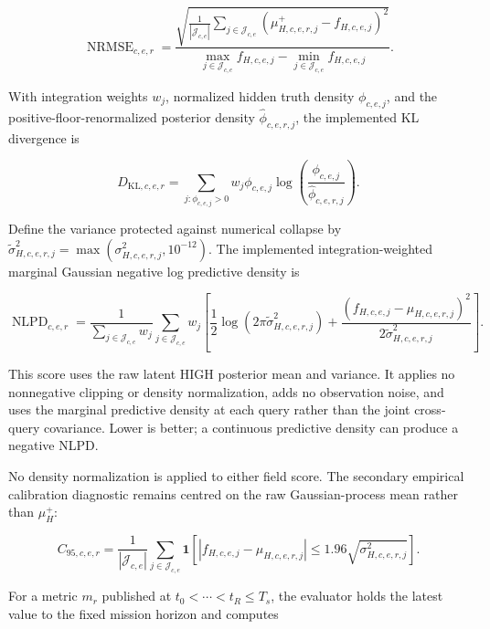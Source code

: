 \documentclass[11pt]{article}
\begin{document}
\begin{equation}
\operatorname{NRMSE}_{c,e,r}
=
\frac{
\sqrt{
\frac{1}{|\mathcal J_{c,e}|}
\sum_{j\in\mathcal J_{c,e}}
(\mu^+_{H,c,e,r,j}-f_{H,c,e,j})^2
}
}{
\max_{j\in\mathcal J_{c,e}}f_{H,c,e,j}
-
\min_{j\in\mathcal J_{c,e}}f_{H,c,e,j}
}.
\end{equation}


With integration weights $w_j$, normalized hidden truth density
$\phi_{c,e,j}$, and the positive-floor-renormalized posterior density
$\widehat\phi_{c,e,r,j}$, the implemented KL divergence is


\begin{equation}
D_{\mathrm{KL},c,e,r}
=
\sum_{j:\phi_{c,e,j}>0}
w_j\phi_{c,e,j}
\log\!\left(
\frac{\phi_{c,e,j}}{\widehat\phi_{c,e,r,j}}
\right).
\end{equation}


Define the variance protected against numerical collapse by
$\widetilde\sigma^2_{H,c,e,r,j}
=\max(\sigma^2_{H,c,e,r,j},10^{-12})$. The implemented
integration-weighted marginal Gaussian negative log predictive density is


\begin{equation}
\operatorname{NLPD}_{c,e,r}
=
\frac{1}{\sum_{j\in\mathcal J_{c,e}}w_j}
\sum_{j\in\mathcal J_{c,e}}w_j
\left[
\frac{1}{2}\log(2\pi\widetilde\sigma^2_{H,c,e,r,j})
+
\frac{(f_{H,c,e,j}-\mu_{H,c,e,r,j})^2}
{2\widetilde\sigma^2_{H,c,e,r,j}}
\right].
\end{equation}


This score uses the raw latent HIGH posterior mean and variance. It applies no
nonnegative clipping or density normalization, adds no observation noise, and
uses the marginal predictive density at each query rather than the joint
cross-query covariance. Lower is better; a continuous predictive density can
produce a negative NLPD.


No density normalization is applied to either field score. The secondary
empirical calibration diagnostic remains centred on the raw Gaussian-process
mean rather than $\mu_H^+$:


\begin{equation}
C_{95,c,e,r}
=
\frac{1}{|\mathcal J_{c,e}|}
\sum_{j\in\mathcal J_{c,e}}
\mathbf 1\!\left[
|f_{H,c,e,j}-\mu_{H,c,e,r,j}|
\le
1.96\sqrt{\sigma^2_{H,c,e,r,j}}
\right].
\end{equation}


For a metric $m_r$ published at $t_0<\cdots<t_R\le T_s$, the evaluator holds
the latest value to the fixed mission horizon and computes
\end{document}
